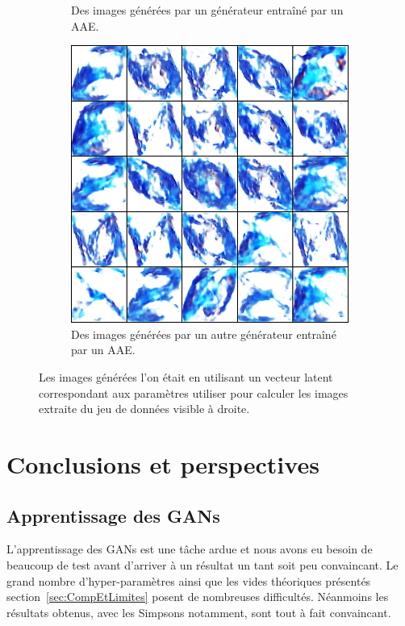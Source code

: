 \documentclass[11pt,francais]{article}
\begin{document}
\begin{figure}[!h]
\begin{subfigure}[b]{0.32\textwidth}
        \caption{Des images générées par un générateur entraîné par un AAE.}
    \end{subfigure}
    \begin{subfigure}[b]{0.32\textwidth}
        \includegraphics[width=\textwidth]{Figures/ComparaisonLS/scan8_eps0,1_lrelu1e06_0.png}
        \caption{Des images générées par un autre générateur entraîné par un AAE.}
    \end{subfigure}
    \caption{Les images générées l'on était en utilisant un vecteur latent correspondant aux paramètres utiliser pour calculer les images extraite du jeu de données visible à droite.}
    \label{fig:fig8}
\end{figure}

\section{Conclusions et perspectives}
\label{sec:Conclusion}

\subsection{Apprentissage des GANs}
L'apprentissage des GANs est une tâche ardue et nous avons eu besoin de beaucoup de test avant d'arriver à un résultat un tant soit peu convaincant. Le grand nombre d'hyper-paramètres ainsi que les vides théoriques présentés section~\ref{sec:CompEtLimites} posent de nombreuses difficultés. Néanmoins les résultats obtenus, avec les Simpsons notamment, sont tout à fait convaincant.
\end{document}
